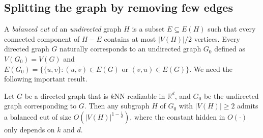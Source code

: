 \documentclass[english]{lipics-v2021}
\begin{document}
\subsection{Splitting the graph by removing few edges} \label{sec-split}

A \textit{balanced cut} of an \textit{undirected} graph $H$ is a subset $E \subseteq E(H)$ such that every connected component of $H- E$ contains at most $|V(H)|/2$ vertices.
Every directed graph $G$ naturally corresponds to an undirected graph $G_0$ defined as $V(G_0) = V(G)$ and $E(G_0) = \{\{u,v\}: (u,v) \in E(G) \text{ or } (v,u) \in E(G)\}$.
We need the following important result.
\begin{lemma} \label{lem-smallcut}
Let $G$ be a directed graph that is $k$NN-realizable in $\mathbb{R}^d$, and $G_0$ be the undirected graph corresponding to $G$.
Then any subgraph $H$ of $G_0$ with $|V(H)| \geq 2$ admits a balanced cut of size $O(|V(H)|^{1-\frac{1}{d}})$, where the constant hidden in $O(\cdot)$ only depends on $k$ and $d$.
\end{lemma}
\end{document}
